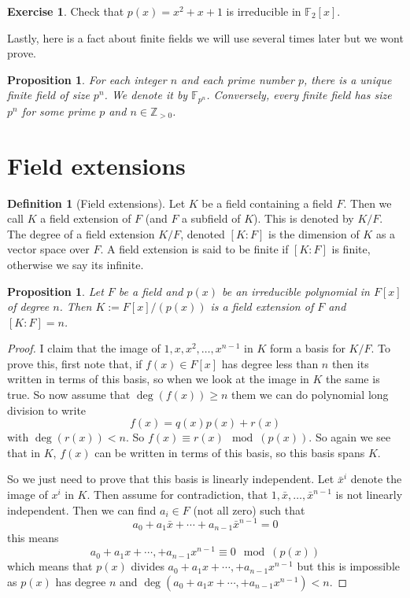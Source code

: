 \documentclass[11pt,a4paper]{report}
\theoremstyle{plain}
\newtheorem{prop}[subsection]{Proposition}
\theoremstyle{definition}
\newtheorem{definition}[subsection]{Definition}
\theoremstyle{definition}
\newtheorem{question}[subsection]{Exercise}
\newcommand{\ZZ}{\mathbb{Z}}
\def\FF{\mathbb{F}}
\begin{document}
	\begin{question}\label{ques: irr pol mod 2}
		Check that $p(x)=x^2+x+1$  is irreducible in $\FF_2[x]$.
	\end{question}
	
	Lastly, here is a fact about finite fields we will use several times later but we wont prove.
	
	\begin{prop}
		For each integer $n$ and each prime number $p$, there is a unique finite field of size $p^n$. We denote it by $\FF_{p^n}$. Conversely, every finite field has size $p^n$ for some prime $p$ and $n \in \ZZ_{> 0}$.
	\end{prop}
	
	\section{Field extensions}
	
	\begin{definition}[Field extensions]
		Let $K$ be a field containing a field $F$. Then we call $K$ a field extension of $F$ (and $F$ a subfield of $K$). This is denoted by $K/F$. The degree of a field extension $K/F$, denoted $[K:F]$ is the dimension of $K$ as a vector space over $F$. A field extension is said to be finite if $[K:F]$ is finite, otherwise we say its infinite.
	\end{definition}	
	
	
	\begin{prop}\label{prop: dim of field ext}
		Let $F$ be a field and $p(x)$ be an irreducible polynomial in $F[x]$ of degree $n$. Then $K:=F[x]/(p(x))$ is a field extension of $F$ and $[K:F]=n$.
	\end{prop}	
	\begin{proof}
		I claim that the image of $1,x,x^2,\dots,x^{n-1}$ in $K$ form a basis for $K/F$. To prove this, first note that, if $f(x) \in F[x]$ has degree less than $n$ then its written in terms of this basis, so when we look at the image in $K$ the same is true. So now assume that $\deg(f(x))\geq n$ them we can do polynomial long division to write \[f(x)=q(x)p(x)+r(x)\] with $\deg(r(x)) < n$. So $f(x) \equiv r(x) \mod (p(x))$. So again we see that in $K$, $f(x)$ can be written in terms of this basis, so this basis spans $K$. 
		
		So we just need to prove that this basis is linearly independent. Let $\bar{x}^i$ denote the image of $x^i$ in $K$. Then assume for contradiction, that $1,\bar x, \dots,\bar{x}^{n-1}$ is not linearly independent. Then we can find $a_i \in F$ (not all zero) such that \[a_0+a_1\bar{x}+\cdots+a_{n-1}\bar{x}^{n-1}=0\] this means \[a_0+a_1 x+\cdots,+a_{n-1}x^{n-1} \equiv 0 \mod (p(x))\] which means that $p(x)$ divides $a_0+a_1 x+\cdots,+a_{n-1}x^{n-1} $ but this is impossible as  $p(x)$ has degree $n$ and  $\deg( a_0+a_1 x+\cdots,+a_{n-1}x^{n-1} )<n$.   
	\end{proof}
	
\end{document}
